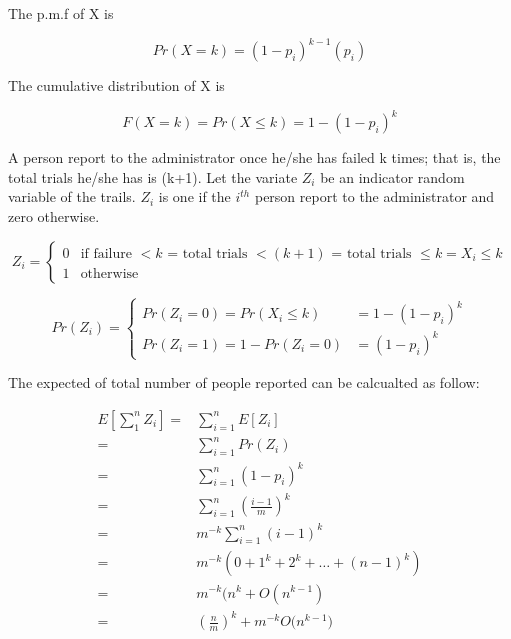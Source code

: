 \documentclass{article}
\begin{document}
\begin{enumerate}
\begin{enumerate}[label*=\arabic*.]
The p.m.f of X is

$$Pr(X=k) = (1-p_i)^{k-1}(p_i)$$

The cumulative distribution of X is

$$F(X=k) = Pr(X \leq k) = 1 - (1-p_i)^k$$

A person report to the administrator once he/she has failed k times; that is, the total trials he/she has is (k+1). Let the variate $Z_i$ be an indicator random variable of the trails. $Z_i$ is one if the $i^{th}$ person report to the administrator and zero otherwise.

$$Z_i = 
\begin{cases}
0 & \text{if failure $< k$ = total trials $< (k+1)$ = total trials $\leq k = X_i \leq k$} \\
1 & \text{otherwise}

\end{cases}
$$

$$Pr(Z_i) = 
\begin{cases}
Pr(Z_i = 0) = Pr(X_i \leq k)  & = 1 - (1-p_i)^{k} \\
Pr(Z_i = 1) = 1 - Pr(Z_i = 0) & = (1-p_i)^{k} 
\end{cases}
$$

The expected of total number of people reported can be calcualted as follow:

\begin{align*}
E[\sum_1^n Z_i] 
    = & \sum_{i=1}^n E[Z_i] \\
    = & \sum_{i=1}^n Pr(Z_i) \\
    = & \sum_{i=1}^n (1-p_i)^{k} \\
    = & \sum_{i=1}^n (\frac{i-1}{m})^{k} \\
    = & m^{-k} \sum_{i=1}^n (i-1)^{k} \\
    = & m^{-k} (0 + 1^k + 2^k + \dots + (n-1)^k) \\
    = & m^{-k} (n^k + O(n^{k-1}) \\
    = & ( \frac{n}{m} )^k + m^{-k} O\big( n^{k-1} \big)
\end{align*}

\gap
\end{enumerate}

\end{enumerate}
\end{document}
